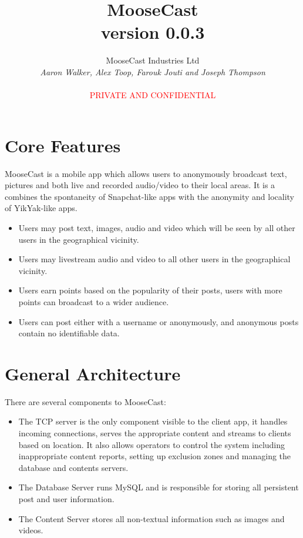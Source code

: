 \documentclass[12pt, a4paper]{article}
\begin{document}
\title{\textbf{MooseCast \\ version 0.0.3}}
\author{MooseCast Industries Ltd \\ \textit{Aaron Walker, Alex Toop, Farouk Jouti and Joseph Thompson} \\ \\ \textcolor{red}{PRIVATE AND CONFIDENTIAL}}
\date{}
\maketitle

\tableofcontents
\clearpage

\section{Core Features}
MooseCast is a mobile app which allows users to anonymously broadcast text, pictures and both live and recorded audio/video to their local areas. It is a combines the spontaneity of Snapchat-like apps with the anonymity and locality of YikYak-like apps. 
\begin{itemize}
\item Users may post text, images, audio and video which will be seen by all other users in the geographical vicinity.
\item Users may livestream audio and video to all other users in the geographical vicinity.
\item Users earn points based on the popularity of their posts, users with more points can broadcast to a wider audience.
\item Users can post either with a username or anonymously, and anonymous posts contain no identifiable data.
\end{itemize} 
\clearpage
\section{General Architecture}
There are several components to MooseCast:
\begin{itemize}
\item The TCP server is the only component visible to the client app, it handles incoming connections, serves the appropriate content and streams to clients based on location. It also allows operators to control the system including inappropriate content reports, setting up exclusion zones and managing the database and contents servers.
\item The Database Server runs MySQL and is responsible for storing all persistent post and user information.
\item The Content Server stores all non-textual information such as images and videos.
\end{itemize}
\end{document}
